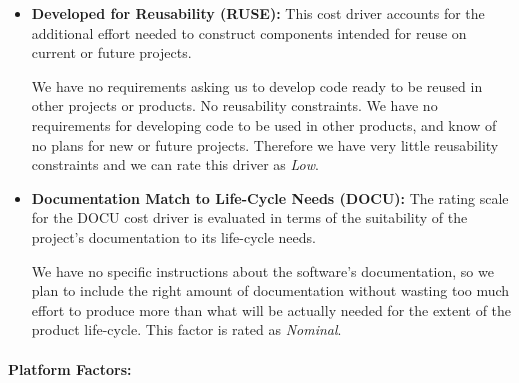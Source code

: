 \documentclass[english]{article}
\begin{document}
\begin{itemize}
%

\item \textbf{Developed for Reusability (RUSE):} This cost driver accounts for the additional effort needed to construct components
intended for reuse on current or future projects.

We have no requirements asking us to develop code ready to be reused in other projects or products. No reusability constraints.
We have no requirements for developing code to be used in other products, and know of no plans for new or future projects. Therefore we have very little reusability constraints and we can rate this driver as \textit{Low}.


\item \textbf{Documentation Match to Life-Cycle Needs (DOCU):} The rating scale for the DOCU cost driver is evaluated in terms of the suitability of the project’s documentation to its life-cycle needs.

We have no specific instructions about the software's documentation, so we plan to include the right amount of documentation without wasting too much effort to produce more than what will be actually needed for the extent of the product life-cycle. This factor is rated as \textit{Nominal}.


\end{itemize}

\paragraph{Platform Factors:}
\end{document}
